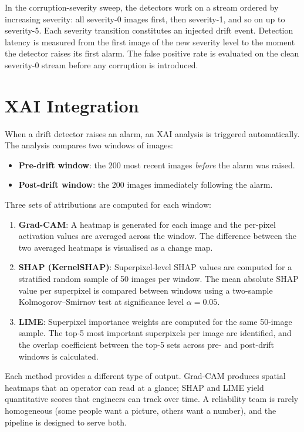 In the corruption-severity sweep, the detectors work on a stream ordered by increasing severity: all severity-0 images first, then severity-1, and so on up to severity-5. Each severity transition constitutes an injected drift event. Detection latency is measured from the first image of the new severity level to the moment the detector raises its first alarm. The false positive rate is evaluated on the clean severity-0 stream before any corruption is introduced.

\section{XAI Integration}
\label{sec:xai-integration}

When a drift detector raises an alarm, an XAI analysis is triggered automatically. The analysis compares two windows of images:

\begin{itemize}
  \item \textbf{Pre-drift window}: the 200 most recent images \textit{before} the alarm was raised.
  \item \textbf{Post-drift window}: the 200 images immediately following the alarm.
\end{itemize}

Three sets of attributions are computed for each window:

\begin{enumerate}
  \item \textbf{Grad-CAM}: A heatmap is generated for each image and the per-pixel activation values are averaged across the window. The difference between the two averaged heatmaps is visualised as a change map.
  \item \textbf{SHAP (KernelSHAP)}: Superpixel-level SHAP values are computed for a stratified random sample of 50 images per window. The mean absolute SHAP value per superpixel is compared between windows using a two-sample Kolmogorov--Smirnov test at significance level $\alpha = 0.05$.
  \item \textbf{LIME}: Superpixel importance weights are computed for the same 50-image sample. The top-5 most important superpixels per image are identified, and the overlap coefficient between the top-5 sets across pre- and post-drift windows is calculated.
\end{enumerate}

Each method provides a different type of output. Grad-CAM produces spatial heatmaps that an operator can read at a glance; SHAP and LIME yield quantitative scores that engineers can track over time. A reliability team is rarely homogeneous (some people want a picture, others want a number), and the pipeline is designed to serve both.

